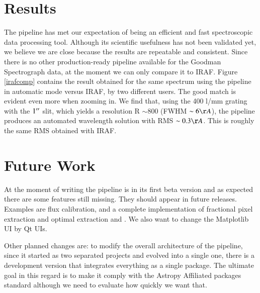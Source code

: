 \documentclass[11pt,twoside]{article}
\begin{document}

\section{Results}
The pipeline has met our expectation of being an efficient and fast
spectroscopic data processing tool. Although its scientific usefulness has not
been validated yet, we believe we are close because the results are
repeatable and consistent. Since there is no other production-ready pipeline
available for the Goodman Spectrograph data, at the moment we can only compare it to
IRAF. Figure \ref{irafcomp} contains the result obtained for the same spectrum using
the pipeline in automatic mode versus IRAF, by two different users. The good
match is evident even more when zooming in. 
We find that, using the 400 l/mm grating with the $1\hbox{$^{\prime\prime}$}$ slit, which yields
a resolution R $\sim 800$ (FWHM $\sim 6 \AA$), the pipeline produces an automated 
wavelength solution with RMS $\sim 0.3 \AA$. This is roughly the same RMS obtained
with IRAF.




\section{Future Work}

At the moment of writing the pipeline is in its first beta version and as
expected there are some features still missing. They should appear in future
releases. Examples are flux calibration, and a complete implementation of fractional pixel
extraction and optimal extraction \citep{1989PASP..101.1032M} and \citep{1986PASP...98..609H}.
We also want to change the Matplotlib UI by Qt UIs.

Other planned changes are: to modify the overall architecture of the pipeline,
since it started as two separated projects and evolved into a single one, there
is a development version that integrates everything as a single package. The 
ultimate goal in this regard is to make it comply with the Astropy Affiliated
packages standard although we need to evaluate how quickly we want that.
\end{document}
